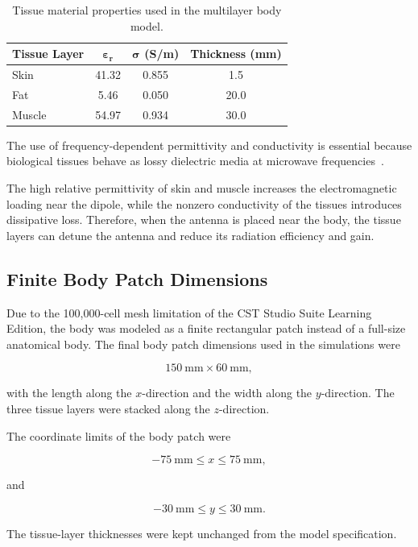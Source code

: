 \begin{table}[htbp]
\centering
\caption{Tissue material properties used in the multilayer body model.}
\label{tab:body-model-materials}
\begin{tabular}{lccc}
\hline
\textbf{Tissue Layer} & \(\boldsymbol{\varepsilon_r}\) & \(\boldsymbol{\sigma}\) \textbf{(S/m)} & \textbf{Thickness (mm)} \\
\hline
Skin & 41.32 & 0.855 & 1.5 \\
Fat & 5.46 & 0.050 & 20.0 \\
Muscle & 54.97 & 0.934 & 30.0 \\
\hline
\end{tabular}
\end{table}
The use of frequency-dependent permittivity and conductivity is essential because biological tissues behave as lossy dielectric media at microwave frequencies~\cite{gabriel1996tissue}.

The high relative permittivity of skin and muscle increases the electromagnetic loading near the dipole, while the nonzero conductivity of the tissues introduces dissipative loss. Therefore, when the antenna is placed near the body, the tissue layers can detune the antenna and reduce its radiation efficiency and gain.

\subsection{Finite Body Patch Dimensions}

Due to the 100,000-cell mesh limitation of the CST Studio Suite Learning Edition, the body was modeled as a finite rectangular patch instead of a full-size anatomical body. The final body patch dimensions used in the simulations were

\[
150~\mathrm{mm} \times 60~\mathrm{mm},
\]

with the length along the \(x\)-direction and the width along the \(y\)-direction. The three tissue layers were stacked along the \(z\)-direction.

The coordinate limits of the body patch were

\[
-75~\mathrm{mm} \leq x \leq 75~\mathrm{mm},
\]

and

\[
-30~\mathrm{mm} \leq y \leq 30~\mathrm{mm}.
\]

The tissue-layer thicknesses were kept unchanged from the model specification.

